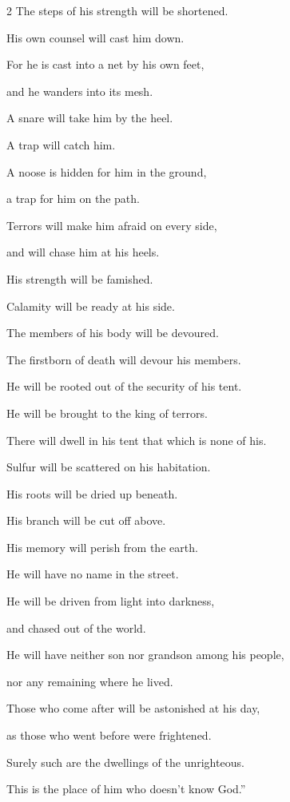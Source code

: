 \begin{multicols}{2}
	\myverse{}The steps of his strength will be shortened.
	
	His own counsel will cast him down.
	
	\myverse{}For he is cast into a net by his own feet,
	
	and he wanders into its mesh.
	
	\myverse{}A snare will take him by the heel.
	
	A trap will catch him.
	
	\myverse{}A noose is hidden for him in the ground,
	
	a trap for him on the path.
	
	\myverse{}Terrors will make him afraid on every side,
	
	and will chase him at his heels.
	
	\myverse{}His strength will be famished.
	
	Calamity will be ready at his side.
	
	\myverse{}The members of his body will be devoured.
	
	The firstborn of death will devour his members.
	
	\myverse{}He will be rooted out of the security of his tent.
	
	He will be brought to the king of terrors.
	
	\myverse{}There will dwell in his tent that which is none of his.
	
	Sulfur will be scattered on his habitation.
	
	\myverse{}His roots will be dried up beneath.
	
	His branch will be cut off above.
	
	\myverse{}His memory will perish from the earth.
	
	He will have no name in the street.
	
	\myverse{}He will be driven from light into darkness,
	
	and chased out of the world.
	
	\myverse{}He will have neither son nor grandson among his people,
	
	nor any remaining where he lived.
	
	\myverse{}Those who come after will be astonished at his day,
	
	as those who went before were frightened.
	
	\myverse{}Surely such are the dwellings of the unrighteous.
	
	This is the place of him who doesn’t know God.”
	

\end{multicols}
